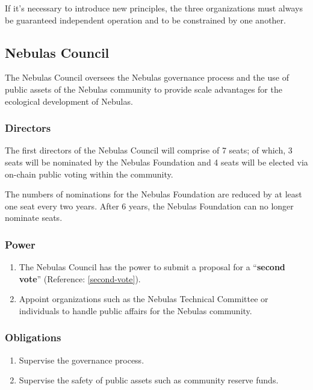 If it’s necessary to introduce new principles, the three organizations must always be guaranteed independent operation and to be constrained by one another.

\subsection{Nebulas Council}

The Nebulas Council oversees the Nebulas governance process and the use of public assets of the Nebulas community to provide scale advantages for the ecological development of Nebulas.

\subsubsection{Directors}

The first directors of the Nebulas Council will comprise of 7 seats; of which, 3 seats will be nominated by the Nebulas Foundation and 4 seats will be elected via on-chain public voting within the community.

The numbers of nominations for the Nebulas Foundation are reduced by at least one seat every two years. After 6 years, the Nebulas Foundation can no longer nominate seats.

\subsubsection{Power}

\begin{enumerate}
	\item The Nebulas Council has the power to submit a proposal for a “\textbf{second vote}” (Reference: \ref{second-vote}).
	\item Appoint organizations such as the Nebulas Technical Committee or individuals to handle public affairs for the Nebulas community.
\end{enumerate}

\subsubsection{Obligations}

\begin{enumerate}
	\item Supervise the governance process.
	\item Supervise the safety of public assets such as community reserve funds.
\end{enumerate}

